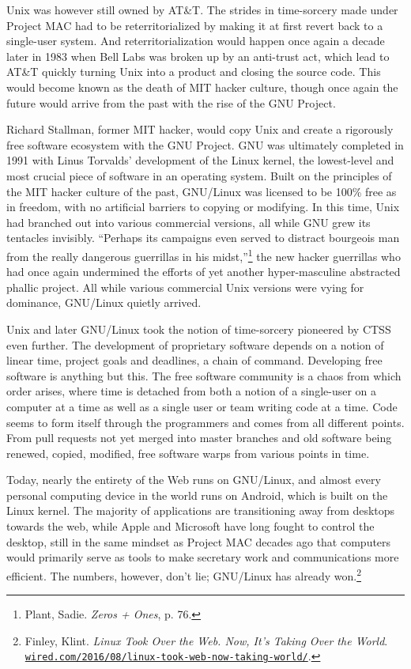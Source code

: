 \documentclass[10pt, statementpaper, twoside, openright]{memoir}
\begin{document}
Unix was however still owned by AT\&T. The strides in time-sorcery made under Project MAC had to be reterritorialized by making it at first revert back to a single-user system. And reterritorialization would happen once again a decade later in 1983 when Bell Labs was broken up by an anti-trust act, which lead to AT\&T quickly turning Unix into a product and closing the source code. This would become known as the death of MIT hacker culture, though once again the future would arrive from the past with the rise of the GNU Project.

Richard Stallman, former MIT hacker, would copy Unix and create a rigorously free software ecosystem with the GNU Project. GNU was ultimately completed in 1991 with Linus Torvalds' development of the Linux kernel, the lowest-level and most crucial piece of software in an operating system. Built on the principles of the MIT hacker culture of the past, GNU/Linux was licensed to be 100\% free as in freedom, with no artificial barriers to copying or modifying. In this time, Unix had branched out into various commercial versions, all while GNU grew its tentacles invisibly. ``Perhaps its campaigns even served to distract bourgeois man from the really dangerous guerrillas in his midst,''\footnote{Plant, Sadie. \textit{Zeros + Ones}, p. 76.} the new hacker guerrillas who had once again undermined the efforts of yet another hyper-masculine abstracted phallic project. All while various commercial Unix versions were vying for dominance, GNU/Linux quietly arrived.

Unix and later GNU/Linux took the notion of time-sorcery pioneered by CTSS even further. The development of proprietary software depends on a notion of linear time, project goals and deadlines, a chain of command. Developing free software is anything but this. The free software community is a chaos from which order arises, where time is detached from both a notion of a single-user on a computer at a time as well as a single user or team writing code at a time. Code seems to form itself through the programmers and comes from all different points. From pull requests not yet merged into master branches and old software being renewed, copied, modified, free software warps from various points in time.

Today, nearly the entirety of the Web runs on GNU/Linux, and almost every personal computing device in the world runs on Android, which is built on the Linux kernel. The majority of applications are transitioning away from desktops towards the web, while Apple and Microsoft have long fought to control the desktop, still in the same mindset as Project MAC decades ago that computers would primarily serve as tools to make secretary work and communications more efficient. The numbers, however, don't lie; GNU/Linux has already won.\footnote{Finley, Klint. \textit{Linux Took Over the Web. Now, It's Taking Over the World}. \href{https://www.wired.com/2016/08/linux-took-web-now-taking-world/}{\nolinkurl{wired.com/2016/08/linux-took-web-now-taking-world/}}.}
\end{document}
